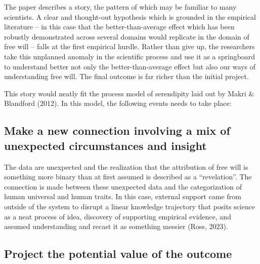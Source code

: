 \documentclass[authordate, commentary]{jote-new-article}
\author[1]{\mbox{Wendy Ross\orcid{0000-0002-0461-7660}}}
\affil[1]{London Metropolitan University}
\author[2]{\mbox{Stuart Firestein\orcid{0000-0003-1774-5853}}}
\affil[2]{Columbia University}
\begin{document}
\begin{frontmatter}
  \maketitle
  \begin{abstract}
    \printabstracttext
  \end{abstract}
\end{frontmatter}



	The paper describes a story, the pattern of which may be familiar to many scientists. A clear and thought-out hypothesis which is grounded in the empirical literature -- in this case that the better-than-average effect which has been robustly demonstrated across several domains would replicate in the domain of free will -- falls at the first empirical hurdle. Rather than give up, the researchers take this unplanned anomaly in the scientific process and use it as a springboard to understand better not only the better-than-average effect but also our ways of understanding free will. The final outcome is far richer than the initial project.



	This story would neatly fit the process model of serendipity laid out by Makri \& Blandford (2012). In this model, the following events needs to take place:



	\subsection{Make a new connection involving a mix of unexpected circumstances and insight}



	The data are unexpected and the realization that the attribution of free will is something more binary than at first assumed is described as a “revelation”. The connection is made between these unexpected data and the categorization of human universal and human traits. In this case, external support came from outside of the system to disrupt a linear knowledge trajectory that posits science as a neat process of idea, discovery of supporting empirical evidence, and assumed understanding and recast it as something messier (Ross, 2023).



	\subsection{Project the potential value of the outcome}
\end{document}
